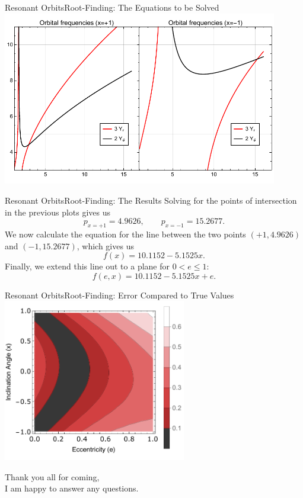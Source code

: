 \documentclass[12pt]{beamer}
\begin{document}
\begin{frame}{Resonant Orbits}{Root-Finding: The Equations to be Solved}
\centering\includegraphics[width=0.9\textwidth]{proretfreqplots.pdf}
\end{frame}

\begin{frame}{Resonant Orbits}{Root-Finding: The Results}
	Solving for the points of intersection in the previous plots gives us
	\begin{equation}
		p_{x=+1}=4.9626,\qquad p_{x=-1}=15.2677.
	\end{equation}
	We now calculate the equation for the line between the two points $(+1,4.9626)$ and $(-1,15.2677)$, which gives us
	\begin{equation}
	f(x)=10.1152-5.1525x.
\end{equation}	 
Finally, we extend this line out to a plane for $0<e\leq 1$:
\begin{equation}
	f(e,x)=10.1152-5.1525x+e.
\end{equation}	 
\end{frame}

\begin{frame}{Resonant Orbits}{Root-Finding: Error Compared to True Values}
\centering\includegraphics[width=0.6\textwidth]{errorContour.pdf}
\end{frame}

\begin{frame}
\begin{center}
\Large{Thank you all for coming,\\
I am happy to answer any questions.}
\end{center}
\end{frame}
\end{document}
